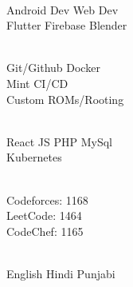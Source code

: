 \documentclass[]{deedy-resume-openfont}
\begin{document}
\begin{minipage}[t]{0.33\textwidth}
 \\
\textbullet{} Android Dev \textbullet{} Web Dev \\ \textbullet{} Flutter \textbullet{} Firebase \textbullet{} Blender \\
\sectionsep

 \\
\textbullet{} Git/Github \textbullet{} Docker \\ \textbullet{} Mint \textbullet{} CI/CD \\ \textbullet{} Custom ROMs/Rooting \\
\sectionsep

 \\
\textbullet{} React JS \textbullet{} PHP \textbullet{} MySql \\ \textbullet{} Kubernetes
\sectionsep

 \\
\textbullet{} Codeforces: 1168 \\
\textbullet{} LeetCode: 1464 \\
\textbullet{} CodeChef: 1165 \\
\sectionsep

 \\
\textbullet{} English \textbullet{} Hindi \textbullet{} Punjabi
\sectionsep

%
%

\end{minipage} 
\hfill
\end{document}

